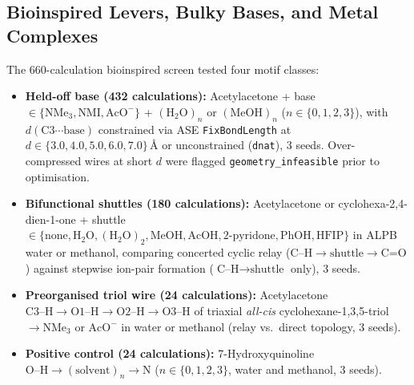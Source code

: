 \documentclass[11pt,a4paper]{article}
\begin{document}
\subsection{Bioinspired Levers, Bulky Bases, and Metal Complexes}
The 660-calculation bioinspired screen tested four motif classes:
\begin{itemize}
\item \textbf{Held-off base (432 calculations):} Acetylacetone + base $\in \{\text{NMe}_3, \text{NMI}, \text{AcO}^-\}$ + $(\text{H}_2\text{O})_n$ or $(\text{MeOH})_n$ ($n \in \{0, 1, 2, 3\}$), with $d(\text{C3}\cdots\text{base})$ constrained via ASE \texttt{FixBondLength} at $d \in \{3.0, 4.0, 5.0, 6.0, 7.0\}$\,\AA{} or unconstrained (\texttt{dnat}), 3 seeds. Over-compressed wires at short $d$ were flagged \texttt{geometry\_infeasible} prior to optimisation.
\item \textbf{Bifunctional shuttles (180 calculations):} Acetylacetone or cyclohexa-2,4-dien-1-one + shuttle $\in \{\text{none}, \text{H}_2\text{O}, (\text{H}_2\text{O})_2, \text{MeOH}, \text{AcOH}, \text{2-pyridone}, \text{PhOH}, \text{HFIP}\}$ in ALPB water or methanol, comparing concerted cyclic relay ($\text{C--H}\to\text{shuttle}\to\text{C=O}$) against stepwise ion-pair formation ($\text{C--H}\to\text{shuttle}$ only), 3 seeds.
\item \textbf{Preorganised triol wire (24 calculations):} Acetylacetone $\text{C3--H} \to \text{O1--H} \to \text{O2--H} \to \text{O3--H}$ of triaxial \textit{all-cis} cyclohexane-1,3,5-triol $\to \text{NMe}_3$ or $\text{AcO}^-$ in water or methanol (relay vs.\ direct topology, 3 seeds).
\item \textbf{Positive control (24 calculations):} 7-Hydroxyquinoline $\text{O--H}\to(\text{solvent})_n\to\text{N}$ ($n \in \{0, 1, 2, 3\}$, water and methanol, 3 seeds).
\end{itemize}
\end{document}
